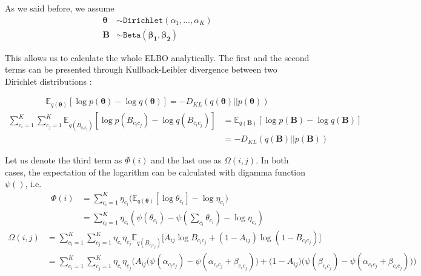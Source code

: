 \documentclass{article}
\renewcommand{\v}[1]{\bm{#1}}
\newcommand{\E}{\mathbb{E}}
\begin{document}
As we said before, we assume 
\begin{align*}
\v{\theta} &\sim \mathtt{Dirichlet}(\alpha_1,...,\alpha_K)\\
\v{B} &\sim \mathtt{Beta}(\v{\beta_1},\v{\beta_2})
\end{align*}


This allows us to calculate the whole ELBO analytically. The first and the second terms can be presented through Kullback-Leibler divergence between two Dirichlet distributions \cite{bibid}:

\begin{equation}
\begin{split}
\E_{q(\v{\theta})}\left[\log p(\v{\theta}) - \log q(\v{\theta})\right] = - D_{KL} \left(q(\v{\theta})||p(\v{\theta})\right) 
\end{split}
\end{equation}
\begin{equation}
\begin{split}
\sum_{c_i=1}^K \sum_{c_j=1}^K \E_{q(B_{c_ic_j})}[\log p(B_{c_ic_j}) - \log q(B_{c_ic_j})] &= 
\E_{q(\v{B})}[\log p(\v{B}) - \log q(\v{B})]\\ &= - D_{KL}\left(q(\v{B})||p(\v{B})\right)
\end{split}
\end{equation}

Let us denote the third term as $\Phi(i)$ and the last one as $\Omega(i,j)$. In both cases, the expectation of the logarithm can be calculated with digamma function $\psi()$, i.e.
\begin{equation}
\begin{split}
\Phi(i) &= \sum_{c_i=1}^K \eta_{c_i} \biggl(\E_{q(\v{\theta})}[\log \theta_{c_i}] - \log \eta_{c_i}\biggr) \\
&= \sum_{c_i=1}^K \eta_{c_i} \left(\psi(\theta_{c_i}) - \psi \left(\sum_{c_i}\theta_{c_i}\right) - \log \eta_{c_i}\right) 
\end{split}
\end{equation}
\begin{equation}
\begin{split}
\Omega(i,j) &= \sum_{c_i=1}^K \sum_{c_j=1}^K \eta_{c_i} \eta_{c_j}
\E_{q(B_{c_ic_j})}\biggl[ A_{ij} \log B_{c_ic_j} + (1 - A_{ij}) \log (1 - B_{c_ic_j}) \biggr]\\
&= \sum_{c_i=1}^K \sum_{c_j=1}^K \eta_{c_i} \eta_{c_j} \Biggl(A_{ij} \biggl(\psi(\alpha_{c_ic_j}) - \psi(\alpha_{c_ic_j} + \beta_{c_ic_j})\biggr) + \biggl(1 - A_{ij}\biggr)\biggl(\psi(\beta_{c_ic_j}) - \psi(\alpha_{c_ic_j} + \beta_{c_ic_j})\biggr)\Biggr)
\end{split}
\end{equation} 
\end{document}
